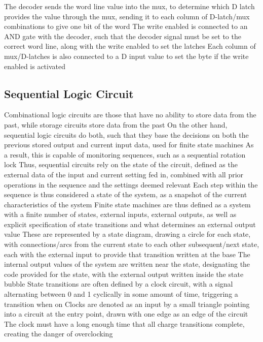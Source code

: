 \documentclass[11 pt, twoside]{article}
\newenvironment{outline*}
{
	\begin{outline}[enumerate]
	}
	{\end{outline}
}
\begin{document}
\begin{outline*}
\2 The decoder sends the word line value into the mux, to determine which D latch provides the value through the mux, sending it to each column of D-latch/mux combinations to give one bit of the word
\2 The write enabled is connected to an AND gate with the decoder, such that the decoder signal must be set to the correct word line, along with the write enabled to set the latches
\2 Each column of mux/D-latches is also connected to a D input value to set the byte if the write enabled is activated
\end{outline*}
\subsection{Sequential Logic Circuit}
\begin{outline*}
\1 Combinational logic circuits are those that have no ability to store data from the past, while storage circuits store data from the past
\2 On the other hand, sequential logic circuits do both, such that they base the decisions on both the previous stored output and current input data, used for finite state machines 
\2 As a result, this is capable of monitoring sequences, such as a sequential rotation lock
\1 Thus, sequential circuits rely on the state of the circuit, defined as the external data of the input and current setting fed in, combined with all prior operations in the sequence and the settings deemed relevant 
\2 Each step within the sequence is thus considered a state of the system, as a snapshot of the current characteristics of the system
\2 Finite state machines are thus defined as a system with a finite number of states, external inputs, external outputs, as well as explicit specification of state transitions and what determines an external output value
\3 These are represented by a state diagram, drawing a circle for each state, with connections/arcs from the current state to each other subsequent/next state, each with the external input to provide that transition written at the base
\3 The internal output values of the system are written near the state, designating the code provided for the state, with the external output written inside the state bubble
\1 State transitions are often defined by a clock circuit, with a signal alternating between 0 and 1 cyclically in some amount of time, triggering a transition when on
\2 Clocks are denoted as an input by a small triangle pointing into a circuit at the entry point, drawn with one edge as an edge of the circuit
\2 The clock must have a long enough time that all charge transitions complete, creating the danger of overclocking

\end{outline*}
\end{document}
